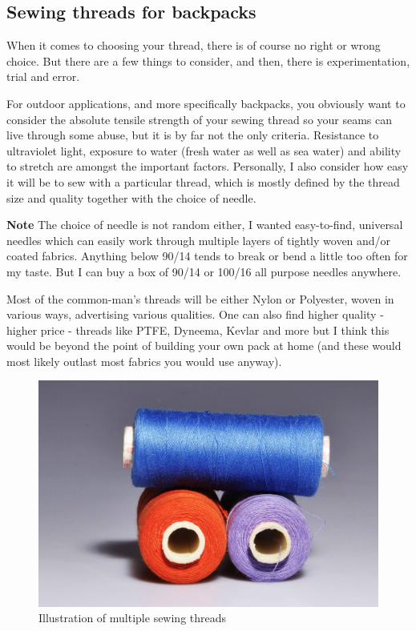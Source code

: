 \subsection{Sewing threads for backpacks} \label{sec:sewing-thread}

When it comes to choosing your thread, there is of course no right or wrong choice. But there are a few things to consider, and then, there is experimentation, trial and error.

For outdoor applications, and more specifically backpacks, you obviously want to consider the absolute tensile strength of your sewing thread so your seams can live through some abuse, but it is by far not the only criteria. Resistance to ultraviolet light, exposure to water (fresh water as well as sea water) and ability to stretch are amongst the important factors. Personally, I also consider how easy it will be to sew with a particular thread, which is mostly defined by the thread size and quality together with the choice of needle.

\begin{tcolorbox}[boxrule=0pt]
  \textbf{Note}
  \newline
  The choice of needle is not random either, I wanted easy-to-find, universal needles which can easily work through multiple layers of tightly woven and/or coated fabrics. Anything below 90/14 tends to break or bend a little too often for my taste. But I can buy a box of 90/14 or 100/16 all purpose needles anywhere.
\end{tcolorbox}

Most of the common-man's threads will be either Nylon or Polyester, woven in various ways, advertising various qualities. One can also find higher quality - higher price - threads like PTFE, Dyneema, Kevlar and more but I think this would be beyond the point of building your own pack at home (and these would most likely outlast most fabrics you would use anyway).

\begin{figure}[H]
  \includegraphics[width=\textwidth]{media/images/place-holder}
  \caption{Illustration of multiple sewing threads}
  \label{img:sewing-threads}
\end{figure}

